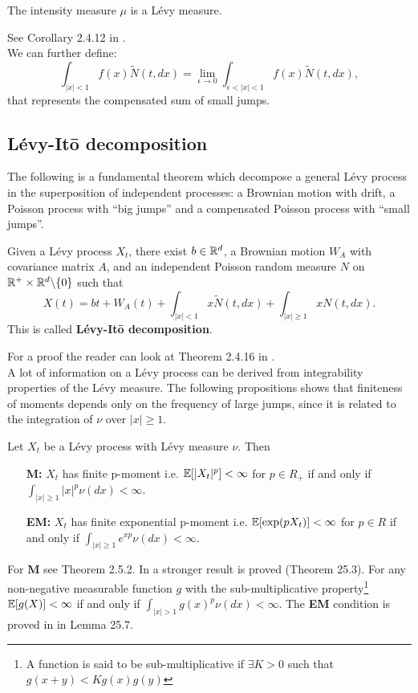 \begin{Theorem}
 The intensity measure $\mu$ is a Lévy measure.
\end{Theorem}
 See Corollary 2.4.12 in \cite{Applebaum}.\\
We can further define:
\begin{equation}
\int_{|x|<1} f(x) \tilde N(t,dx) = \lim_{\epsilon \to 0} \int_{\epsilon < |x| < 1} f(x) \tilde N(t,dx), 
\end{equation}
that represents the compensated sum of small jumps.

 
\subsection{Lévy-It\={o} decomposition}

The following is a fundamental theorem which decompose a general Lévy process in the superposition 
of independent processes: a Brownian motion with drift, a Poisson process with ``big jumps'' and a compensated Poisson process with ``small jumps''.

\begin{Theorem}
 Given a Lévy process $X_t$, there exist $b\in \mathbb{R}^d$, a Brownian motion $W_A$ with covariance matrix $A$, and an 
 independent Poisson random measure $N$ on $\mathbb{R}^+ \times \mathbb{R}^d \backslash \{0\}$ such that
 \begin{equation}\label{Levy_Ito}
  X(t) = bt + W_A(t) + \int_{|x|<1} x \tilde{N}(t,dx) + \int_{|x|\geq1} x N(t,dx).
 \end{equation}
 This is called \textbf{Lévy-It\={o} decomposition}.
\end{Theorem}
 For a proof the reader can look at Theorem 2.4.16 in \cite{Applebaum}.\\
A lot of information on a Lévy process can be derived from integrability properties of the Lévy measure. 
The following propositions shows that finiteness of moments depends only on the frequency of large jumps, since
it is related to the integration of $\nu$ over ${|x| \geq 1}$.
\begin{Theorem} \label{assumptionM}
 Let $X_t$ be a Lévy process with Lévy measure $\nu$. Then
 \begin{enumerate}
  \item[\textbf{M:}] \label{M} $X_t$ has finite p-moment i.e. 
  $\mathbb{E}[|X_t|^p]<\infty$ for $p\in R_+$ if and only if $\int_{|x| \geq 1} |x|^p \nu(dx) <\infty$.
  \item[\textbf{EM:}] \label{EM} $X_t$ has finite exponential p-moment i.e. $\mathbb{E}[\exp(pX_t)]<\infty$ for $p\in R$ if and only if 
  $\int_{|x| \geq 1} e^{xp} \nu(dx) <\infty$.
 \end{enumerate}
\end{Theorem}
 For \textbf{M} see \cite{Applebaum} Theorem 2.5.2. 
 In \cite{Sato} a stronger result is proved (Theorem 25.3). For any non-negative measurable function $g$ with the sub-multiplicative
 property\footnote{A function is said to be sub-multiplicative if $\exists K>0$ such that $g(x+y)<Kg(x)g(y)$ } $\mathbb{E}[g(X)]<\infty$ if and only if $\int_{|x| > 1} g(x)^p \nu(dx) <\infty$.
 The \textbf{EM} condition is proved in \cite{Sato} in Lemma 25.7.\\

